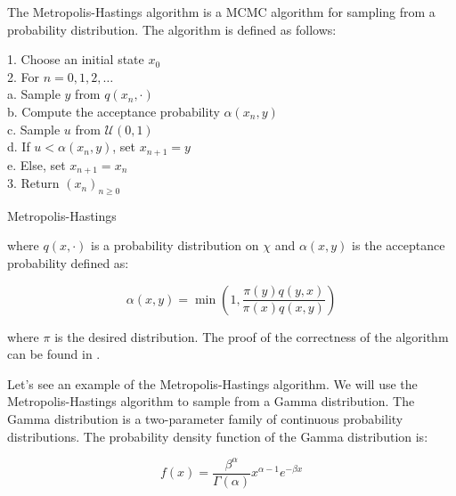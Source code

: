 \documentclass{article}
\begin{document}
The Metropolis-Hastings algorithm is a MCMC algorithm for sampling from a probability distribution. The algorithm is defined as follows:

\begin{center}
	\begin{minipage}{0.7\linewidth} %
		\begin{algorithm}[H]
			1. Choose an initial state $x_0$ \\
			2. For $n = 0, 1, 2, \dots$ \\
			\hspace*{0.5cm} a. Sample $y$ from $q(x_n, \cdot)$ \\
			\hspace*{0.5cm} b. Compute the acceptance probability $\alpha(x_n, y)$ \\
			\hspace*{0.5cm} c. Sample $u$ from $\mathcal{U}(0,1)$ \\
			\hspace*{0.5cm} d. If $u < \alpha(x_n, y)$, set $x_{n+1} = y$ \\
			\hspace*{0.5cm} e. Else, set $x_{n+1} = x_n$ \\
			3. Return $(x_n)_{n \geq 0}$
			\caption{Metropolis-Hastings} %
			\label{alg:Metropolis-Hastings}   %
		\end{algorithm}
	\end{minipage}
\end{center}

where $q(x, \cdot)$ is a probability distribution on $\chi$ and $\alpha(x,y)$ is the acceptance probability defined as:

\[
	\alpha(x,y) = \min \left(1, \frac{\pi(y) q(y,x)}{\pi(x) q(x,y)} \right)
\]

where $\pi$ is the desired distribution. The proof of the correctness of the algorithm can be found in \cite{wiki:metropolishastings}.


Let's see an example of the Metropolis-Hastings algorithm. We will use the Metropolis-Hastings algorithm to sample from a Gamma distribution. The Gamma distribution is a two-parameter family of continuous probability distributions. The probability density function of the Gamma distribution is:

\[
	f(x) = \frac{\beta^\alpha}{\Gamma(\alpha)} x^{\alpha - 1} e^{-\beta x}
\]
\end{document}
